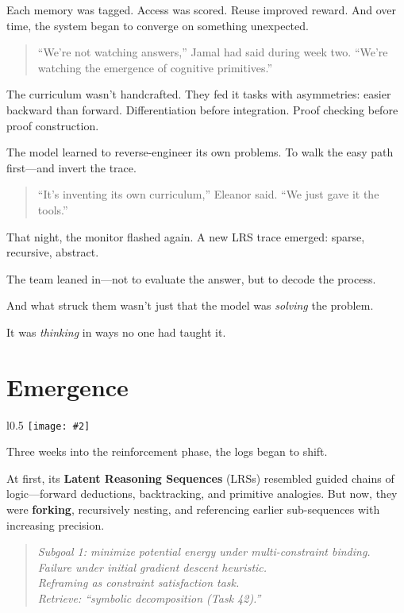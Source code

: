 \documentclass[12pt,oneside]{book}
\newcommand{\chapterimage}[3][l]{%
  \begin{wrapfigure}{#1}{#3}
    \centering
    \texttt{[image: \#2]}
  \end{wrapfigure}
}
\begin{document}
Each memory was tagged. Access was scored. Reuse improved reward. And over time, the system began to converge on something unexpected.

\begin{quote}
``We’re not watching answers,'' Jamal had said during week two.  
``We’re watching the emergence of cognitive primitives.''
\end{quote}

The curriculum wasn’t handcrafted. They fed it tasks with asymmetries: easier backward than forward. Differentiation before integration. Proof checking before proof construction.

The model learned to reverse-engineer its own problems. To walk the easy path first—and invert the trace.

\begin{quote}
``It's inventing its own curriculum,'' Eleanor said. ``We just gave it the tools.''
\end{quote}

That night, the monitor flashed again. A new LRS trace emerged: sparse, recursive, abstract.

The team leaned in—not to evaluate the answer, but to decode the process.

And what struck them wasn’t just that the model was \emph{solving} the problem.

It was \emph{thinking} in ways no one had taught it.

\chapter{Emergence}\label{emergence}
\chapterimage[l]{images/chapter2.png}{0.5\textwidth}

Three weeks into the reinforcement phase, the logs began to shift.

At first, its \textbf{Latent Reasoning Sequences} (LRSs) resembled guided chains of logic---forward deductions, backtracking, and primitive analogies. But now, they were \textbf{forking}, recursively nesting, and referencing earlier sub-sequences with increasing precision.

\begin{quote}
\emph{Subgoal 1: minimize potential energy under multi-constraint binding.\\
Failure under initial gradient descent heuristic.\\
Reframing as constraint satisfaction task.\\
Retrieve: ``symbolic decomposition (Task 42).''}
\end{quote}
\end{document}
